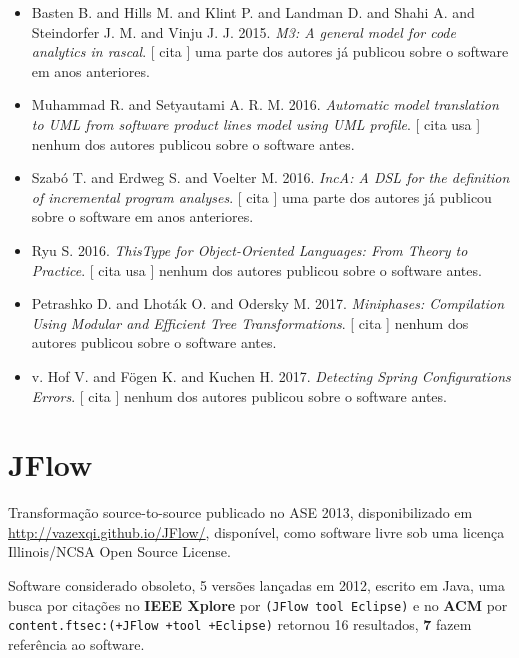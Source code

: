 \begin{itemize}
      [
          cita
      ]
uma parte dos autores já publicou sobre o software em anos anteriores.
\item Basten B. and Hills M. and Klint P. and Landman D. and Shahi A. and Steindorfer J. M. and Vinju J. J.
      2015.
        \textit{ M3: A general model for code analytics in rascal}.
      [
          cita
      ]
uma parte dos autores já publicou sobre o software em anos anteriores.
\item Muhammad R. and Setyautami A. R. M.
      2016.
        \textit{ Automatic model translation to UML from software product lines model using UML profile}.
      [
          cita
          usa
      ]
nenhum dos autores publicou sobre o software antes.
\item Szabó T. and Erdweg S. and Voelter M.
      2016.
        \textit{ IncA: A DSL for the definition of incremental program analyses}.
      [
          cita
      ]
uma parte dos autores já publicou sobre o software em anos anteriores.
\item Ryu S.
      2016.
        \textit{ ThisType for Object-Oriented Languages: From Theory to Practice}.
      [
          cita
          usa
      ]
nenhum dos autores publicou sobre o software antes.
\item Petrashko D. and Lhot\'{a}k O. and Odersky M.
      2017.
        \textit{ Miniphases: Compilation Using Modular and Efficient Tree Transformations}.
      [
          cita
      ]
nenhum dos autores publicou sobre o software antes.
\item v. Hof V. and F\"{o}gen K. and Kuchen H.
      2017.
        \textit{ Detecting Spring Configurations Errors}.
      [
          cita
      ]
nenhum dos autores publicou sobre o software antes.
\end{itemize}
\section{JFlow}

Transformação source-to-source
publicado no ASE 2013,
disponibilizado em \url{http://vazexqi.github.io/JFlow/},
disponível,
como software livre
sob uma licença Illinois/NCSA Open Source License.

Software considerado obsoleto,
5 versões lançadas
em 2012,
escrito em Java,
uma busca por citações no {\bf IEEE Xplore} por
\texttt{(JFlow tool Eclipse)}
e no {\bf ACM} por
\texttt{content.ftsec:(+JFlow +tool +Eclipse)}
retornou
16 resultados,
{\bf 7} fazem referência ao software.


